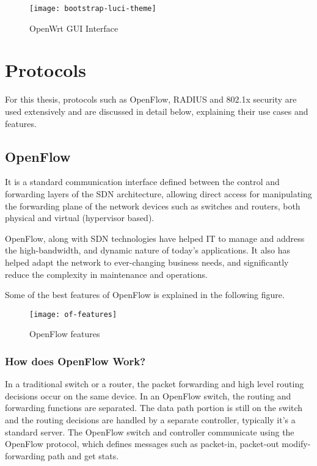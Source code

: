 \begin{figure}[H]
	\centering
	\texttt{[image: bootstrap-luci-theme]}
	\caption{OpenWrt GUI Interface \cite{openwrt_luci_img}} \label{fig:OpenWrt_gui}
	\vspace{-10pt}
\end{figure}
\section{Protocols} \label{protocols}
For this thesis, protocols such as OpenFlow, RADIUS and 802.1x security are used extensively and are discussed in detail below, explaining their use cases and features.
\subsection{OpenFlow \cite{WhatIsOpenFlow}} \label{OpenFlow}

It is a standard communication interface defined between the control and forwarding layers of the SDN architecture, allowing direct access for manipulating the forwarding plane of the network devices such as switches and routers, both physical and virtual (hypervisor based).

OpenFlow, along with SDN technologies have helped IT to manage and address the high-bandwidth, and dynamic nature of today’s applications. It also has helped adapt the network to ever-changing business needs, and significantly reduce the complexity in maintenance and operations.

Some of the best features of OpenFlow is explained in the following figure.

\begin{figure}[H]
	\centering
	\texttt{[image: of-features]}
	\caption{OpenFlow features \cite{openflow_features}} \label{fig:OF_features}
	\vspace{-10pt}
\end{figure}

\subsubsection{How does OpenFlow Work? \cite{OpenFlow_functionality}} \label{OpenFlow_Functionality}
In a traditional switch or a router, the packet forwarding and high level routing decisions occur on the same device. In an OpenFlow switch, the routing and forwarding functions are separated. The data path portion is still on the switch and the routing decisions are handled by a separate controller, typically it’s a standard server. The OpenFlow switch and controller communicate using the OpenFlow protocol, which defines messages such as packet-in, packet-out modify-forwarding path and get stats.
